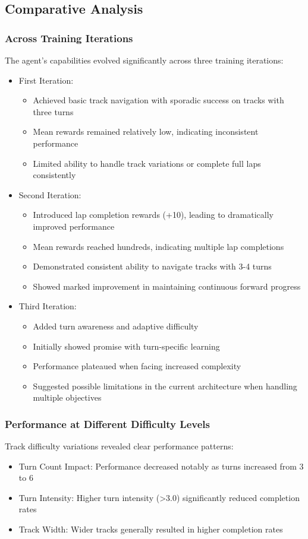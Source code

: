 \documentclass[10pt,twocolumn]{article}
\begin{document}
\subsection{Comparative Analysis}
\subsubsection{Across Training Iterations}
The agent's capabilities evolved significantly across three training iterations:
\begin{itemize}
    \item First Iteration:
    \begin{itemize}
        \item Achieved basic track navigation with sporadic success on tracks with three turns
        \item Mean rewards remained relatively low, indicating inconsistent performance
        \item Limited ability to handle track variations or complete full laps consistently
    \end{itemize}
    \item Second Iteration:
    \begin{itemize}
        \item Introduced lap completion rewards (+10), leading to dramatically improved performance
        \item Mean rewards reached hundreds, indicating multiple lap completions
        \item Demonstrated consistent ability to navigate tracks with 3-4 turns
        \item Showed marked improvement in maintaining continuous forward progress
    \end{itemize}
    \item Third Iteration:
    \begin{itemize}
        \item Added turn awareness and adaptive difficulty
        \item Initially showed promise with turn-specific learning
        \item Performance plateaued when facing increased complexity
        \item Suggested possible limitations in the current architecture when handling multiple objectives
    \end{itemize}
\end{itemize}


\subsubsection{Performance at Different Difficulty Levels}
Track difficulty variations revealed clear performance patterns:
\begin{itemize}
\item Turn Count Impact: Performance decreased notably as turns increased from 3 to 6
\item Turn Intensity: Higher turn intensity (>3.0) significantly reduced completion rates
\item Track Width: Wider tracks generally resulted in higher completion rates
\end{itemize}
\end{document}
